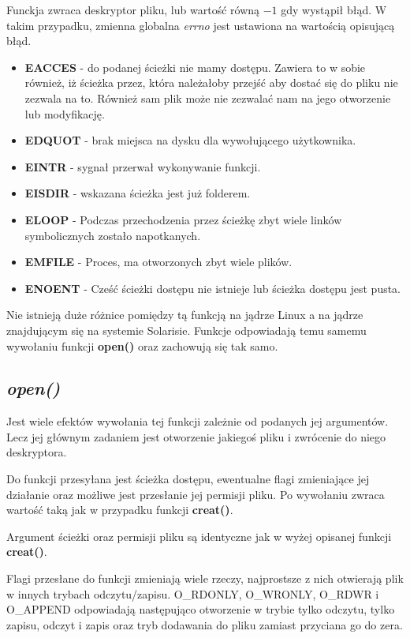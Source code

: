 \documentclass{article}
\begin{document}
Funckja zwraca deskryptor pliku, lub wartość równą $-1$ gdy wystąpił błąd.
W takim przypadku, zmienna globalna \textit{errno} jest ustawiona na wartością opisującą błąd.
\begin{itemize}
\item \textbf{EACCES} - do podanej ścieżki nie mamy dostępu. Zawiera to w sobie również,
iż ścieżka przez, która należałoby przejść aby dostać się do pliku nie zezwala na to.
Również sam plik może nie zezwalać nam na jego otworzenie lub modyfikację.
\item \textbf{EDQUOT} - brak miejsca na dysku dla wywołującego użytkownika.
\item \textbf{EINTR} - sygnał przerwał wykonywanie funkcji.
\item \textbf{EISDIR} - wskazana ścieżka jest już folderem.
\item \textbf{ELOOP} - Podczas przechodzenia przez ścieżkę zbyt wiele linków symbolicznych zostało napotkanych.
\item \textbf{EMFILE} - Proces, ma otworzonych zbyt wiele plików.
\item \textbf{ENOENT} - Cześć ścieżki dostępu nie istnieje lub ścieżka dostępu jest pusta.
\end{itemize}

Nie istnieją duże różnice pomiędzy tą funkcją na jądrze Linux a na jądrze znajdującym się na systemie Solarisie.
Funkcje odpowiadają temu samemu wywołaniu funkcji \textbf{open()} oraz zachowują się tak samo.

\subsection{\textit{open()}}
Jest wiele efektów wywołania tej funkcji zależnie od podanych jej argumentów.
Lecz jej głównym zadaniem jest otworzenie jakiegoś pliku i zwrócenie do niego deskryptora.

Do funkcji przesyłana jest ścieżka dostępu, ewentualne flagi zmieniające jej działanie oraz możliwe jest przesłanie jej permisji pliku.
Po wywołaniu zwraca wartość taką jak w przypadku funkcji \textbf{creat()}.

Argument ścieżki oraz permisji pliku są identyczne jak w wyżej opisanej funkcji \textbf{creat()}.

Flagi przesłane do funkcji zmieniają wiele rzeczy, najprostsze z nich otwierają plik w innych trybach odczytu/zapisu.
O\_RDONLY, O\_WRONLY, O\_RDWR i O\_APPEND odpowiadają następująco otworzenie w trybie tylko odczytu, tylko zapisu, odczyt i zapis oraz tryb dodawania do pliku zamiast przyciana go do zera.
\end{document}
